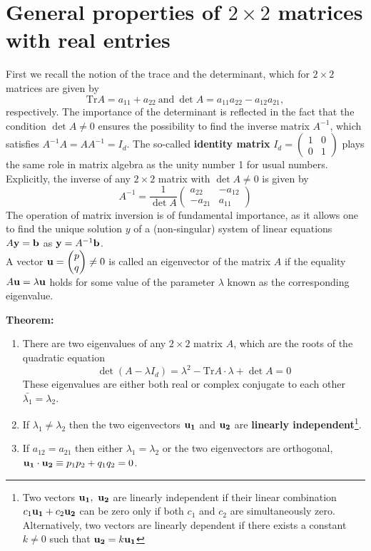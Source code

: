 \documentclass[11pt,a4paper,twoside]{article}
\begin{document}
	\mytitle
	\section{General properties of $2 \times 2$ matrices with real entries}
	First we recall the notion of the trace and the determinant, which for $2 \times 2$ matrices are given by
	$$
	\text{Tr}A = a_{11} + a_{22}\ \text{and}\ \det A = a_{11}a_{22} − a_{12}a_{21},
	$$
	respectively. The importance of the determinant is reflected in the fact that the condition $\det A \neq 0$ ensures the possibility to find the inverse matrix $A^{-1}$,  which satisfies $A^{-1}A = AA^{-1} = I_d$. The so-called \textbf{identity matrix}
	$I_d
	=
	\begin{pmatrix}
		1 & 0\\
		0 & 1
	\end{pmatrix}
	$
	plays the same role in matrix algebra as the unity number 1 for usual numbers. Explicitly, the inverse of any $2 \times 2$ matrix with $\det A \neq 0$ is given by
	\begin{equation}\label{4.7}
		A^{-1}
		= \frac{1}{\det A}
		\begin{pmatrix}
			a_{22} & -a_{12}\\
			-a_{21} & a_{11}
		\end{pmatrix}
	\end{equation}
	The operation of matrix inversion is of fundamental importance, as it allows one to find the unique solution $y$ of a (non-singular) system of linear equations $A\vb{y} = \vb{b}$ as $\vb{y} = A^{-1}\vb{b}$.\\
	A vector
	$
	\vb{u}
	=
	\begin{pmatrix}
		p\\
		q
	\end{pmatrix}\neq 0
	$
	is called an eigenvector of the matrix $A$ if the equality $A\vb{u} = \lambda \vb{u}$ holds for some value of the parameter $\lambda$ known as the corresponding eigenvalue.\par
	\textbf{Theorem:}
	\begin{enumerate}
		\item There are two eigenvalues of any $2 \times 2$ matrix $A$, which are the roots of the quadratic equation
		\begin{equation}\label{4.8}
			\det (A-\lambda I_d) = \lambda^2 - \text{Tr}A\cdot \lambda + \det A = 0
		\end{equation}
		These eigenvalues are either both real or complex conjugate to each other $\bar{\lambda_1} = \lambda_2$.
		\item  If $\lambda_1 \neq \lambda_2$ then the two eigenvectors $\vb{u_1}$ and $\vb{u_2}$ are \textbf{linearly independent}\footnote{Two vectors $\vb{u_1},\ \vb{u_2}$ are linearly independent if their linear combination $c_1\vb{u_1} + c_2\vb{u_2}$ can be zero only if both $c_1$ and $c_2$ are simultaneously zero. Alternatively, two vectors are linearly dependent if there exists a constant $k \neq 0$ such that $\vb{u_2} = k\vb{u_1}$}.
		\item If $a_{12} = a_{21}$ then either $\lambda_1 = \lambda_2$ or the two eigenvectors are orthogonal, $\vb{u_1} \cdot \vb{u_2} \equiv p_1p_2 + q_1q_2 = 0$.
	\end{enumerate}
\end{document}
